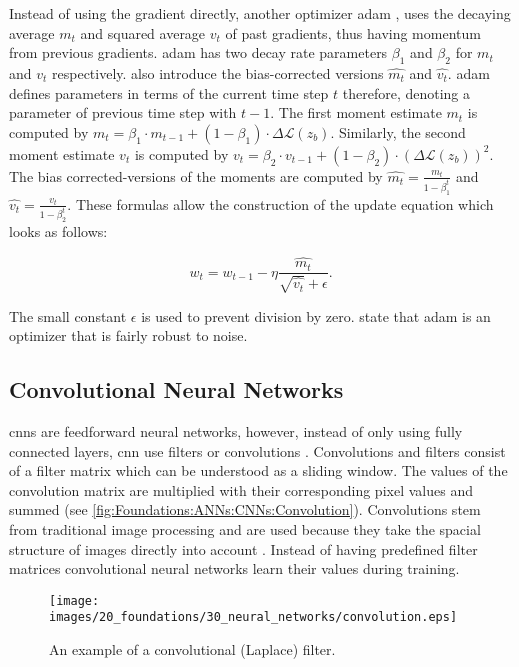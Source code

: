 Instead of using the gradient directly, another optimizer \ac{adam} \cite{kingma2017adam}, uses the decaying average $m_t$ and squared average $v_t$ of past gradients, thus having momentum from previous gradients. \Ac{adam} has two decay rate parameters $\beta_1$ and $\beta_2$ for $m_t$ and $v_t$ respectively. \textcite{kingma2017adam} also introduce the bias-corrected versions $\hat{m_t}$ and $\hat{v_t}$. \Ac{adam} defines parameters in terms of the current time step $t$ therefore, denoting a parameter of previous time step with $t-1$. The first moment estimate $m_t$ is computed by $m_t = \beta_1 \cdot m_{t-1} + (1 - \beta_1) \cdot \Delta \mathcal{L}(z_b)$. Similarly, the second moment estimate $v_t$ is computed by $v_t = \beta_2 \cdot v_{t-1} + (1 - \beta_2) \cdot (\Delta \mathcal{L}(z_b))^2$. 
The bias corrected-versions of the moments are computed by $\hat{m_t} = \frac{m_t}{1 - \beta_1^t}$ and $\hat{v_t} = \frac{v_t}{1 - \beta_2^t}$. These formulas allow the construction of the update equation which looks as follows:

$$w_t = w_{t-1} - \eta \frac{\hat{m_t}}{\sqrt{\hat{v_t}} + \epsilon} \text{.}$$

The small constant $\epsilon$ is used to prevent division by zero. \textcite{kingma2017adam} state that \ac{adam} is an optimizer that is fairly robust to noise.


\subsection{Convolutional Neural Networks}
\label{sec:Foundations:NeuralNetworks:CNN}

\Acp{cnn} are feedforward neural networks, however, instead of only using fully connected layers, \ac{cnn} use filters or convolutions \cite{teuwen2020convolutional}. Convolutions and filters consist of a filter matrix which can be understood as a sliding window. The values of the convolution matrix are multiplied with their corresponding pixel values and summed (see \autoref{fig:Foundations:ANNs:CNNs:Convolution}). Convolutions stem from traditional image processing \cite{shih2010image} and are used because they take the spacial structure of images directly into account \cite{nielsen2015neural}. Instead of having predefined filter matrices convolutional neural networks learn their values during training.

\begin{figure}
    \centering
    \texttt{[image: images/20\_foundations/30\_neural\_networks/convolution.eps]}
    \caption{An example of a convolutional (Laplace) filter.}
    \label{fig:Foundations:ANNs:CNNs:Convolution}
\end{figure}


